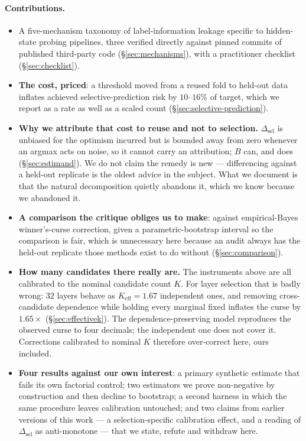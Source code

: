 \documentclass{article}
\begin{document}
\paragraph{Contributions.}
\begin{itemize}
\itemsep0pt
\item A five-mechanism taxonomy of label-information leakage specific to
   hidden-state probing pipelines, three verified directly against pinned
   commits of published third-party code (\S\ref{sec:mechanisms}), with a
   practitioner checklist (\S\ref{sec:checklist}).
\item \textbf{The cost, priced}: a threshold moved from a reused fold to
   held-out data inflates achieved selective-prediction risk by
   $10$--$16\%$ of target, which we report as a rate as well as a scaled
   count (\S\ref{sec:selective-prediction}).
\item \textbf{Why we attribute that cost to reuse and not to selection.}
   $\Delta_{\text{sel}}$ is unbiased for the optimism incurred but is bounded
   away from zero whenever an argmax acts on noise, so it cannot carry an
   attribution; $B$ can, and does (\S\ref{sec:estimand}). We do not claim the
   remedy is new --- differencing against a held-out replicate is the oldest
   advice in the subject. What we document is that the natural decomposition
   quietly abandons it, which we know because we abandoned it.
\item \textbf{A comparison the critique obliges us to make}: against
   empirical-Bayes winner's-curse correction, given a parametric-bootstrap
   interval so the comparison is fair, which is unnecessary here because an
   audit always has the held-out replicate those methods exist to do without
   (\S\ref{sec:comparison}).
\item \textbf{How many candidates there really are.} The instruments above
   are all calibrated to the nominal candidate count $K$. For layer selection
   that is badly wrong: $32$ layers behave as $K_{\text{eff}}=1.67$
   independent ones, and removing cross-candidate dependence while holding
   every marginal fixed inflates the curse by $1.65\times$
   (\S\ref{sec:effectivek}). The dependence-preserving model reproduces the
   observed curse to four decimals; the independent one does not cover it.
   Corrections calibrated to nominal $K$ therefore over-correct here, ours
   included.
\item \textbf{Four results against our own interest}: a primary synthetic
   estimate that fails its own factorial control; two estimators we prove
   non-negative by construction and then decline to bootstrap; a second
   harness in which the same procedure leaves calibration untouched; and two
   claims from earlier versions of this work --- a selection-specific
   calibration effect, and a reading of $\Delta_{\text{sel}}$ as
   anti-monotone --- that we state, refute and withdraw here.
\end{itemize}
\end{document}
